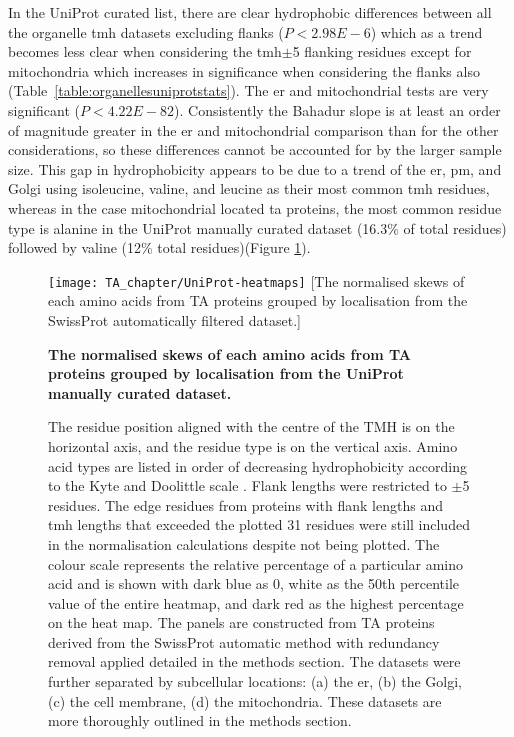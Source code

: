 In the UniProt curated list, there are clear hydrophobic differences between all the organelle \gls{tmh} datasets excluding flanks ($P<2.98E-6$) which as a trend becomes less clear when considering the \gls{tmh}$\pm$5 flanking residues except for mitochondria which increases in significance when considering the flanks also (Table~\ref{table:organellesuniprotstats}).
The \gls{er} and mitochondrial tests are very significant ($P<4.22E-82$).
Consistently the Bahadur slope is at least an order of magnitude greater in the \gls{er} and mitochondrial comparison than for the other considerations, so these differences cannot be accounted for by the larger sample size.
This gap in hydrophobicity appears to be due to a trend of the \gls{er}, \gls{pm}, and Golgi using isoleucine, valine, and leucine as their most common \gls{tmh} residues, whereas in the case mitochondrial located \gls{ta} proteins, the most common residue type is alanine in the UniProt manually curated dataset (16.3\% of total residues) followed by valine (12\% total residues)(Figure \ref{fig:uniprot-heatmap}).

\begin{figure}
\centering
\texttt{[image: TA\_chapter/UniProt-heatmaps]}
[The normalised skews of each amino acids from TA proteins grouped by localisation from the SwissProt automatically filtered dataset.]
{\textbf{The normalised skews of each amino acids from TA proteins grouped by localisation from the UniProt manually curated dataset.}

The residue position aligned with the centre of the TMH is on the horizontal axis, and the residue type is on the vertical axis.
Amino acid types are listed in order of decreasing hydrophobicity according to the Kyte and Doolittle scale \cite{Kyte1982}.
Flank lengths were restricted to $\pm$5 residues.
The edge residues from proteins with flank lengths and \gls{tmh} lengths that exceeded the plotted 31 residues were still included in the normalisation calculations despite not being plotted.
The colour scale represents the relative percentage of a particular amino acid and is shown with dark blue as 0, white as the 50th percentile value of the entire heatmap, and dark red as the highest percentage on the heat map.
The panels are constructed from TA proteins derived from the SwissProt automatic method with redundancy removal applied detailed in the methods section.
The datasets were further separated by subcellular locations: (a) the \gls{er}, (b) the Golgi, (c) the cell membrane, (d) the mitochondria.
These datasets are more thoroughly outlined in the methods section.
}

\label{fig:uniprot-heatmap}
\end{figure}


